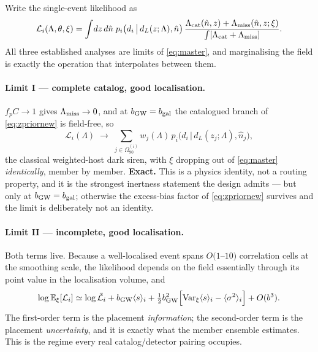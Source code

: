 \documentclass[11pt]{article}
\theoremstyle{definition}
\theoremstyle{remark}
\newcommand{\bn}{\hat{n}}
\newcommand{\bgw}{b_{\rm GW}}
\newcommand{\bgal}{b_{\rm gal}}
\newcommand{\Lmiss}{\Lambda_{\rm miss}}
\newcommand{\Lcat}{\Lambda_{\rm cat}}
\newcommand{\Var}{\mathrm{Var}}
\begin{document}
Write the single-event likelihood as
\begin{equation}
  \mathcal L_i(\Lambda,\theta,\xi)
  =\int\!dz\,d\bn\;p_i\big(d_i\,\big|\,d_L(z;\Lambda),\bn\big)\,
  \frac{\Lcat(\bn,z)+\Lmiss(\bn,z;\xi)}{\int[\Lcat+\Lmiss]} .
  \label{eq:master}
\end{equation}
All three established analyses are limits of \eqref{eq:master}, and marginalising
the field is exactly the operation that interpolates between them.

\paragraph{Limit I --- complete catalog, good localisation.} $f_pC\to1$ gives
$\Lmiss\to0$, and at $\bgw=\bgal$ the catalogued branch of \eqref{eq:zpriornew} is
field-free, so
\begin{equation}
  \mathcal L_i(\Lambda)\;\longrightarrow\;
  \sum_{j\in\Omega_{90}^{(i)}}w_j(\Lambda)\,p_i\big(d_i\,\big|\,d_L(z_j;\Lambda),\bn_j\big),
  \label{eq:limit1}
\end{equation}
the classical weighted-host dark siren, with $\xi$ dropping out of
\eqref{eq:master} \emph{identically}, member by member. \textbf{Exact.} This is a
physics identity, not a routing property, and it is the strongest inertness
statement the design admits --- but only at $\bgw=\bgal$; otherwise the excess-bias
factor of \eqref{eq:zpriornew} survives and the limit is deliberately not an
identity.

\paragraph{Limit II --- incomplete, good localisation.} Both terms live. Because a
well-localised event spans $O(1$--$10)$ correlation cells at the smoothing scale,
the likelihood depends on the field essentially through its point value in the
localisation volume, and
\begin{equation}
  \log\mathbb E_\xi[\mathcal L_i]\simeq\log\bar{\mathcal L}_i
  +\bgw\langle s\rangle_i
  +\tfrac12\bgw^2\Big[\Var_\xi\langle s\rangle_i-\langle\sigma^2\rangle_i\Big]+O(b^3).
  \label{eq:limit2}
\end{equation}
The first-order term is the placement \emph{information}; the second-order term is
the placement \emph{uncertainty}, and it is exactly what the member ensemble
estimates. This is the regime every real catalog/detector pairing occupies.
\end{document}
